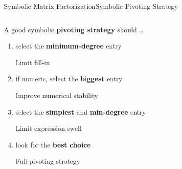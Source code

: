 \begin{frame}{Symbolic Matrix Factorization}{Symbolic Pivoting Strategy}
  \vspace{-1.75em}
  \vspace{-0.75em}
  \begin{columns}
    \begin{column}[c]{0.5\textwidth}
      A good symbolic \textbf{pivoting strategy} should \dots
      \begin{enumerate}
        \item<1> select the \textbf{minimum-degree} entry \\
        \begin{small}
          \qquad Limit fill-in
        \end{small}
        \item<2> if numeric, select the \textbf{biggest} entry \\
        \begin{small}
          \qquad Improve numerical stability
        \end{small}
        \item<3> select the \textbf{simplest} and \textbf{min-degree} entry \\
        \begin{small}
          \qquad Limit expression swell
        \end{small}
        \item<4> look for the \textbf{best choice} \\
        \begin{small}
          \qquad Full-pivoting strategy
        \end{small}
      \end{enumerate}
    \end{column}
    \begin{column}[c]{0.6\textwidth}
      \begin{algorithmic}\scriptsize
        \State {} %

\end{algorithmic}
\end{column}
\end{columns}
\end{frame}
